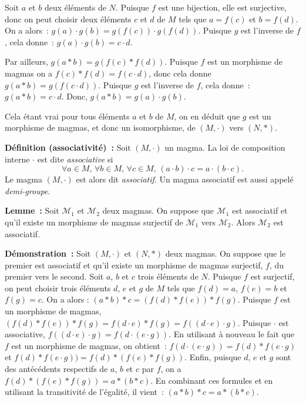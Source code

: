     Soit $a$ et $b$ deux éléments de $N$. 
    Puisque $f$ est une bijection, elle est surjective, donc on peut choisir deux éléments $c$ et $d$ de $M$ tels que $a = f(c)$ et $b = f(d)$. 
    On a alors : $g(a) \cdot g(b) = g(f(c)) \cdot g(f(d))$.
    Puisque $g$ est l'inverse de $f$, cela donne : $g(a) \cdot g(b) = c \cdot d$. 

    Par ailleurs, $g(a \ast b) = g(f(c) \ast f(d))$. 
    Puisque $f$ est un morphisme de magmas on a $f(c) \ast f(d) = f (c \cdot d)$, donc cela donne $g(a \ast b) = g(f(c \cdot d))$.
    Puisque $g$ est l'inverse de $f$, cela donne : $g(a \ast b) = c \cdot d$. 
    Donc, $g(a \ast b) = g(a) \cdot g(b)$. 

    Cela étant vrai pour tous éléments $a$ et $b$ de $M$, on en déduit que $g$ est un morphisme de magmas, et donc un isomorphisme, de $\left(M, \cdot \right)$ vers $\left(N, \ast \right)$.

    \hfill \square

\medskip

\noindent\textbf{Définition (associativité) :} Soit $(M,\cdot)$ un magma.
    La loi de composition interne $\cdot$ est dite \textit{associative} si
    \begin{equation*}
        \forall a \in M, \, \forall b \in M, \, \forall c \in M , \,  
        (a \cdot b) \cdot c = a \cdot (b \cdot c).
    \end{equation*}
    Le magma $(M, \cdot)$ est alors dit \textit{associatif}. 
    Un magma associatif est aussi appelé \textit{demi-groupe}.

\medskip

\noindent\textbf{Lemme :} Soit $\mathcal{M}_1$ et $\mathcal{M}_2$ deux magmas.
    On suppose que $\mathcal{M}_1$ est associatif et qu'il existe un morphisme de magmas surjectif de $\mathcal{M}_1$ vers $\mathcal{M}_2$.
    Alors $\mathcal{M}_2$ est associatif.

\medskip

\noindent\textbf{Démonstration :} Soit $(M,\cdot)$ et $(N,\ast)$ deux magmas. 
    On suppose que le premier est associatif et qu'il existe un morphisme de magmas surjectif, $f$, du premier vers le second. 
    Soit $a$, $b$ et $c$ trois éléments de $N$. 
    Puisque $f$ est surjectif, on peut choisir trois éléments $d$, $e$ et $g$ de $M$ tels que $f(d) = a$, $f(e) = b$ et $f(g) = c$.
    On a alors : $(a \ast b) \ast c = (f(d) \ast f(e)) \ast f(g)$.
    Puisque $f$ est un morphisme de magmas, $(f(d) \ast f(e)) \ast f(g) = f(d \cdot e) \ast f(g) = f((d \cdot e) \cdot g)$.
    Puisque $\cdot$ est associative, $f((d \cdot e) \cdot g) = f(d \cdot (e \cdot g))$. 
    En utilisant à nouveau le fait que $f$ est un morphisme de magmas, on obtient : $f(d \cdot (e \cdot g)) = f(d) \ast f(e \cdot g)$ et $f(d) \ast f(e \cdot g)) = f(d) \ast (f(e) \ast f(g))$. 
    Enfin, puisque $d$, $e$ et $g$ sont des antécédents respectifs de $a$, $b$ et $c$ par $f$, on a $f(d) \ast (f(e) \ast f(g)) = a \ast (b \ast c)$. 
    En combinant ces formules et en utilisant la transitivité de l'égalité, il vient : $(a \ast b) \ast c = a \ast (b \ast c)$.

